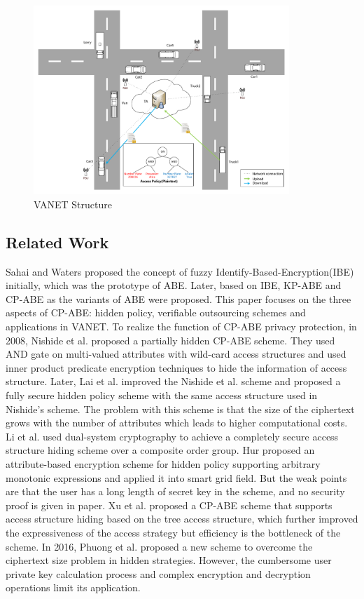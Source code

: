 \documentclass[smallextended]{svjour3}       %
\begin{document}
	\begin{figure}\label{VANET}
		\centering
		\includegraphics[width=3.8in, keepaspectratio]{VANET.pdf}
		\caption{VANET Structure}
	\end{figure}
 
\subsection{Related Work}
	Sahai and Waters proposed the concept of fuzzy Identify-Based-Encryption(IBE) initially, which was the prototype of ABE.
	Later, based on IBE, KP-ABE and CP-ABE as the variants of ABE were proposed.
	This paper focuses on the three aspects of CP-ABE: hidden policy, verifiable outsourcing schemes and applications in VANET.
	To realize the function of CP-ABE privacy protection, in 2008, Nishide et al. proposed a partially hidden CP-ABE scheme.
	They used AND gate on multi-valued attributes with wild-card access structures and used inner product predicate encryption techniques to hide the information of access structure.
	Later, Lai et al. improved the Nishide et al. scheme and proposed a fully secure hidden policy scheme with the same access structure used in Nishide's scheme.
	The problem with this scheme is that the size of the ciphertext grows with the number of attributes which leads to higher computational costs. 
	Li et al. used dual-system cryptography to achieve a completely secure access structure hiding scheme over a composite order group.
	Hur proposed an attribute-based encryption scheme for hidden policy supporting arbitrary monotonic expressions and applied it into smart grid field.
	But the weak points are that the user has a long length of secret key in the scheme, and no security proof is given in paper.
	Xu et al. proposed a CP-ABE scheme that supports access structure hiding based on the tree access structure, which further improved the expressiveness of the access strategy but efficiency is the bottleneck of the scheme.
	In 2016, Phuong et al. proposed a new scheme to overcome the ciphertext size problem in hidden strategies. However, the cumbersome user private key calculation process and complex encryption and decryption operations limit its application.
	
\end{document}
